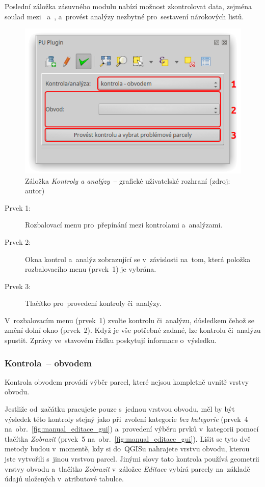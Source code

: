 Poslední záložka zásuvného modulu nabízí možnost zkontrolovat data,
zejména soulad mezi~ a~, a~provést analýzy nezbytné
pro~sestavení nárokových listů.

	\begin{figure}[H] \centering
		\includegraphics[width=.55\textwidth]{./pictures/ca_gui.png}
		\caption[Záložka \textit{Kontroly a analýzy}~–
grafické uživatelské rozhraní]{Záložka \textit{Kontroly a analýzy}~–
grafické uživatelské rozhraní (zdroj: autor)}
		\label{fig:manual_ca_gui}
 	\end{figure}

\begin{description}
	\item[Prvek 1:] Rozbalovací menu pro~přepínání mezi kontrolami
a~analýzami.
	\item[Prvek 2:] Okna kontrol a~analýz zobrazující se
v~závislosti na~tom, která položka rozbalovacího menu (prvek~1) je
vybrána.
	\item[Prvek 3:] Tlačítko pro~provedení kontroly či~analýzy.
\end{description}

V~rozbalovacím menu (prvek~1) zvolte kontrolu či~analýzu, důsledkem
čehož se změní dolní okno (prvek~2). Když je vše potřebné zadané, lze
kontrolu či~analýzu spustit. Zprávy ve~stavovém řádku poskytují
informace o~výsledku.

\subsubsection{Kontrola~– obvodem}
\label{manual_kontrola_obvodem}

Kontrola obvodem provádí výběr parcel, které nejsou kompletně uvnitř
vrstvy obvodu.

Jestliže od~začátku pracujete pouze s~jednou vrstvou obvodu, měl by
být výsledek této kontroly stejný jako při~zvolení kategorie
\textit{bez kategorie} (prvek~4 na~obr.~\ref{fig:manual_editace_gui})
a~provedení výběru prvků v~kategorii pomocí tlačítka \textit{Zobrazit}
(prvek~5 na~obr.~\ref{fig:manual_editace_gui}). Lišit se tyto dvě
metody budou v~momentě, kdy si do~QGISu nahrajete vrstvu obvodu,
kterou jste vytvořili s~jinou vrstvou parcel. Jinými slovy tato
kontrola používá geometrii vrstvy obvodu a~tlačítko \textit{Zobrazit}
v~záložce \textit{Editace} vybírá parcely na~základě údajů uložených
v~atributové tabulce.


